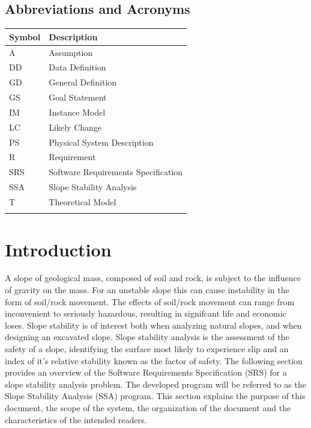 \documentclass[12pt]{article}
\begin{document}
\subsection{Abbreviations and Acronyms}
\label{Sec:AaA}
\begin{longtable*}{l l}
\toprule
Symbol & Description
\\
\midrule
A & Assumption
\\
DD & Data Definition
\\
GD & General Definition
\\
GS & Goal Statement
\\
IM & Instance Model
\\
LC & Likely Change
\\
PS & Physical System Description
\\
R & Requirement
\\
SRS & Software Requirements Specification
\\
SSA & Slope Stability Analysis
\\
T & Theoretical Model
\\
\bottomrule
\label{Table:AaA}
\end{longtable*}
\section{Introduction}
\label{Sec:I}
A slope of geological mass, composed of soil and rock, is subject to the influence of gravity on the mass. For an unstable slope this can cause instability in the form of soil/rock movement. The effects of soil/rock movement can range from inconvenient to seriously hazardous, resulting in signifcant life and economic loses. Slope stability is of interest both when analyzing natural slopes, and when designing an excavated slope. Slope stability analysis is the assessment of the safety of a slope, identifying the surface most likely to experience slip and an index of it's relative stability known as the factor of safety.
The following section provides an overview of the Software Requirements Specification (SRS) for a slope stability analysis problem. The developed program will be referred to as the Slope Stability Analysis (SSA) program. This section explains the purpose of this document, the scope of the system, the organization of the document and the characteristics of the intended readers.
\end{document}
